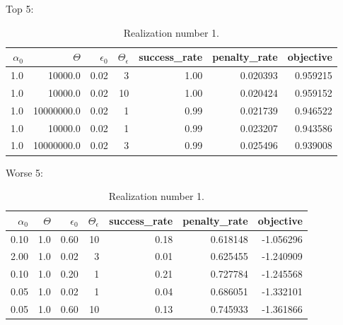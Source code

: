 \documentclass[conference]{IEEEtran}
\begin{document}
\begin{table}
\scriptsize
Top 5: \newline
\begin{tabular}{rrrrrrr}
\hline
$\alpha_0$ &    $\Theta$ &  $\epsilon_0$ &  $\Theta_\epsilon$ &  success\_rate &  penalty\_rate &  objective \\
\hline
     1.0 &     10000.0 &       0.02 &                  3 &          1.00 &      0.020393 &   0.959215 \\
     1.0 &     10000.0 &       0.02 &                 10 &          1.00 &      0.020424 &   0.959152 \\
     1.0 &  10000000.0 &       0.02 &                  1 &          0.99 &      0.021739 &   0.946522 \\
     1.0 &     10000.0 &       0.02 &                  1 &          0.99 &      0.023207 &   0.943586 \\
     1.0 &  10000000.0 &       0.02 &                  3 &          0.99 &      0.025496 &   0.939008 \\
\hline
\end{tabular}

\vspace{1em} Worse 5: \newline
\begin{tabular}{rrrrrrr}
\hline
$\alpha_0$ &    $\Theta$ &  $\epsilon_0$ &  $\Theta_\epsilon$ &  success\_rate &  penalty\_rate &  objective \\
\hline
    0.10 &    1.0 &       0.60 &                 10 &          0.18 &      0.618148 &  -1.056296 \\
    2.00 &    1.0 &       0.02 &                  3 &          0.01 &      0.625455 &  -1.240909 \\
    0.10 &    1.0 &       0.20 &                  1 &          0.21 &      0.727784 &  -1.245568 \\
    0.05 &    1.0 &       0.02 &                  1 &          0.04 &      0.686051 &  -1.332101 \\
    0.05 &    1.0 &       0.60 &                 10 &          0.13 &      0.745933 &  -1.361866 \\
\hline
\end{tabular}
\vspace{2em}
\caption{Realization number 1.}
\label{tab:01}
\end{table}
\end{document}
